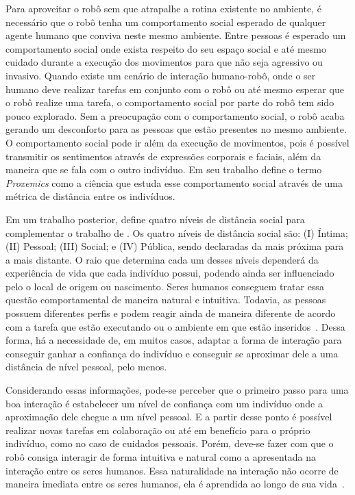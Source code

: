 Para aproveitar o robô sem que atrapalhe a rotina existente no ambiente, é necessário que o robô tenha um comportamento social esperado de qualquer agente humano que conviva neste mesmo ambiente. Entre pessoas é esperado um comportamento social onde exista respeito do seu espaço social e até mesmo cuidado durante a execução dos movimentos para que não seja agressivo ou invasivo. Quando existe um cenário de interação humano-robô, onde o ser humano deve realizar tarefas em conjunto com o robô ou até mesmo esperar que o robô realize uma tarefa, o comportamento social por parte do robô tem sido pouco explorado. Sem a preocupação com o comportamento social, o robô acaba gerando um desconforto para as pessoas que estão presentes no mesmo ambiente. O comportamento social pode ir além da execução de movimentos, pois é possível transmitir os sentimentos através de expressões corporais e faciais, além da maneira que se fala com o outro indivíduo. Em seu trabalho  define o termo \emph{Proxemics} como a ciência que estuda esse comportamento social através de uma métrica de distância entre os indivíduos.

Em um trabalho posterior,  define quatro níveis de distância social para complementar o trabalho de . Os quatro níveis de distância social são: (I) Íntima; (II) Pessoal; (III) Social; e (IV) Pública, sendo declaradas da mais próxima para a mais distante. O raio que determina cada um desses níveis dependerá da experiência de vida que cada indivíduo possui, podendo ainda ser influenciado pelo o local de origem ou nascimento. Seres humanos conseguem tratar essa questão comportamental de maneira natural e intuitiva. Todavia, as pessoas possuem diferentes perfis e podem reagir ainda de maneira diferente de acordo com a tarefa que estão executando ou o ambiente em que estão inseridos~\cite{Jung:1991}. Dessa forma, há a necessidade de, em muitos casos, adaptar a forma de interação para conseguir ganhar a confiança do indivíduo e conseguir se aproximar dele a uma distância de nível pessoal, pelo menos.

Considerando essas informações, pode-se perceber que o primeiro passo para uma boa interação é estabelecer um nível de confiança com um indivíduo onde a aproximação dele chegue a um nível pessoal. E a partir desse ponto é possível realizar novas tarefas em colaboração ou até em benefício para o próprio indivíduo, como no caso de cuidados pessoais. Porém, deve-se fazer com que o robô consiga interagir de forma intuitiva e natural como a apresentada na interação entre os seres humanos. Essa naturalidade na interação não ocorre de maneira imediata entre os seres humanos, ela é aprendida ao longo de sua vida~\cite{Hall:1969, Argyle:1988}.

